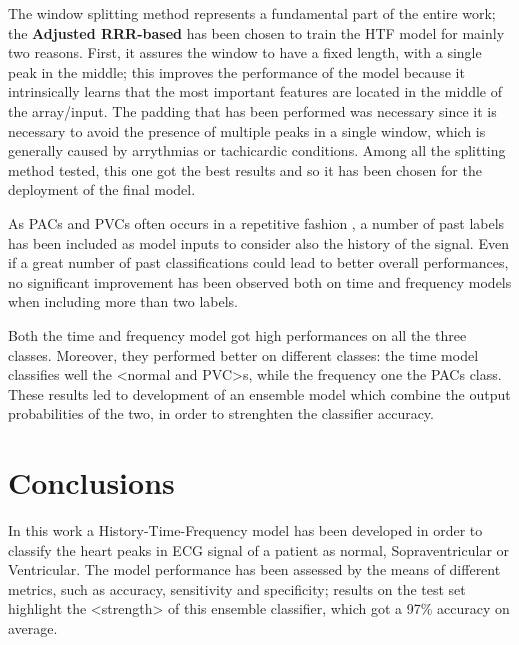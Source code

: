 \documentclass[conference]{IEEEtran}
\begin{document}
    The window splitting method represents a fundamental part of the entire
    work; the \textbf{Adjusted RRR-based} has been chosen to train the HTF model for mainly two reasons.
    First, it assures the window to have a fixed length, with a single peak in
    the middle; this improves the performance of the model because it intrinsically learns that the 
    most important features are located in the middle of the array/input.
    The padding that has been performed was necessary since it is necessary to
    avoid the presence of multiple peaks in a single window, which is generally
    caused by arrythmias or tachicardic conditions. Among  all the 
    splitting method tested, this one got the best results and so it has been 
    chosen for the deployment of the final model. 

    As PACs and PVCs often occurs in a repetitive fashion \cite{premature_v}, a number of past
    labels has been included as model inputs to consider also the history 
    of the signal. Even if a great number of
    past classifications could lead to better overall performances, no
    significant improvement has been observed both on time and frequency 
    models when including more than two labels.
    
    Both the time and frequency model got high performances on all the three 
    classes. Moreover, they performed better on different classes: the time 
    model classifies well the <normal and PVC>s, 
    while the frequency one the PACs class. These results led to development 
    of an ensemble model which combine the output probabilities of the two, 
    in order to strenghten the classifier accuracy. 

\section{Conclusions}
    In this work a History-Time-Frequency model has been developed in order 
    to classify the heart peaks in ECG signal of a patient as normal,
    Sopraventricular or Ventricular. 
    The model performance has been assessed by the means of different metrics, 
    such as accuracy, sensitivity and specificity; results on the test set 
    highlight the <strength> of this ensemble classifier, which got a 97\%
    accuracy on average.
\end{document}
